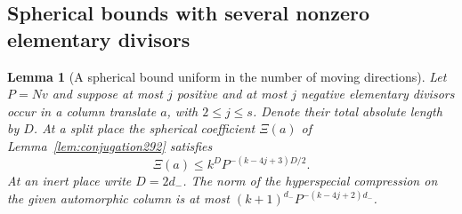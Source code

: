 \documentclass[a4paper,11pt]{article}
\newtheorem{lemma}[proposition]{Lemma}
\theoremstyle{definition}
\theoremstyle{remark}
\numberwithin{equation}{section}
\begin{document}
\subsection{Spherical bounds with several nonzero elementary divisors}\label{nav:III-61}
\begin{lemma}[A spherical bound uniform in the number of moving directions]\leavevmode
\label{lem:blocksphere297}
Let \(P=Nv\) and suppose at most \(j\) positive and at most
\(j\) negative elementary divisors occur in a column translate
\(a\), with \(2\le j\le s\). Denote their total absolute length
by \(D\). At a split place the spherical coefficient \(\Xi(a)\)
of Lemma~\ref{lem:conjugation292} satisfies
\[
       \Xi(a)\le k^D P^{-(k-4j+3)D/2}.
\]
At an inert place write \(D=2d_-\). The norm of the
hyperspecial compression on the given automorphic column
is at most \((k+1)^{d_-} P^{-(k-4j+2)d_-}\).
\end{lemma}
\end{document}
